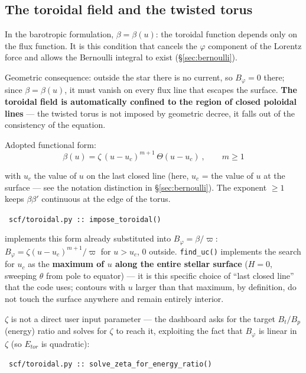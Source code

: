 \documentclass[11pt,a4paper]{scrartcl}
\newcommand{\arrowto}[1]{%
  \par\vspace{2pt}\noindent{\color{linkblue}$\rightarrow$}~\texttt{\small #1}\par\vspace{2pt}}
\newcommand{\code}[1]{\texttt{\small #1}}
\begin{document}
\subsection{The toroidal field and the twisted torus}
\label{sec:toroidal}

In the barotropic formulation, $\beta=\beta(u)$: the toroidal function
depends only on the flux function. It is this condition that cancels the
$\varphi$ component of the Lorentz force and allows the Bernoulli
integral to exist (\S\ref{sec:bernoulli}).

Geometric consequence: outside the star there is no current, so
$B_\varphi=0$ there; since $\beta=\beta(u)$, it must vanish on every flux
line that escapes the surface. \textbf{The toroidal field is
automatically confined to the region of closed poloidal lines} --- the
twisted torus is not imposed by geometric decree, it falls out of the
consistency of the equation.

Adopted functional form:
\begin{equation}
\beta(u) = \zeta\,(u-u_c)^{m+1}\,\Theta(u-u_c)\ , \qquad m\ge1
\end{equation}

with $u_c$ the value of $u$ on the last closed line (here, $u_c$ = the
value of $u$ at the surface --- see the notation distinction in
\S\ref{sec:bernoulli}). The exponent $\ge1$ keeps $\beta\beta'$
continuous at the edge of the torus.

\arrowto{scf/toroidal.py :: impose\_toroidal()} implements this form already substituted into $B_\varphi=\beta/\varpi$: $B_\varphi=\zeta(u-u_c)^{m+1}/\varpi$ for $u>u_c$, $0$ outside. \code{find\_uc()} implements the search for $u_c$ as the \textbf{maximum of $u$ along the entire stellar surface} ($H=0$, sweeping $\theta$ from pole to equator) --- it is this specific choice of ``last closed line'' that the code uses; contours with $u$ larger than that maximum, by definition, do not touch the surface anywhere and remain entirely interior.

$\zeta$ is not a direct user input parameter --- the dashboard asks for
the target $B_t/B_p$ (energy) ratio and solves for $\zeta$ to reach it,
exploiting the fact that $B_\varphi$ is linear in $\zeta$ (so $E_{tor}$
is quadratic):

\arrowto{scf/toroidal.py :: solve\_zeta\_for\_energy\_ratio()}
\end{document}
